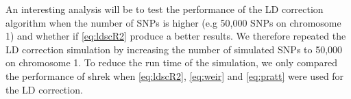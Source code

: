 	An interesting analysis will be to test the performance of the \gls{LD} correction algorithm when the number of \glspl{SNP} is higher (e.g 50,000 \glspl{SNP} on chromosome 1) and whether if \cref{eq:ldscR2} produce a better results.
	We therefore repeated the \gls{LD} correction simulation by increasing the number of simulated \glspl{SNP} to 50,000 on chromosome 1.
	To reduce the run time of the simulation, we only compared the performance of \gls{shrek} when \cref{eq:ldscR2}, \cref{eq:weir} and \cref{eq:pratt} were used for the \gls{LD} correction.
	\begin{figure}[t]
		\centering
\end{figure}
